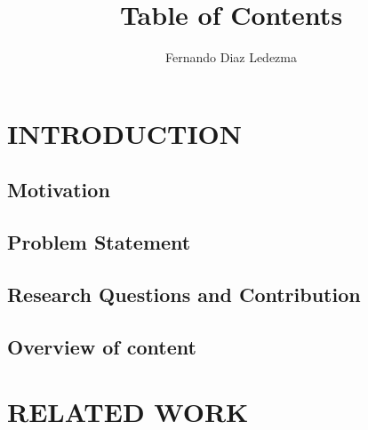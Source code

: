 \documentclass{article}
\title{Table of Contents}
\author{Fernando Diaz Ledezma}
\date{ }
\begin{document}
	
	\maketitle
	
	\tableofcontents
	
\section{INTRODUCTION}
\subsection{Motivation}
\subsection{Problem Statement}
\subsection{Research Questions and Contribution}
\subsection{Overview of content}

\section{RELATED WORK}
\end{document}
